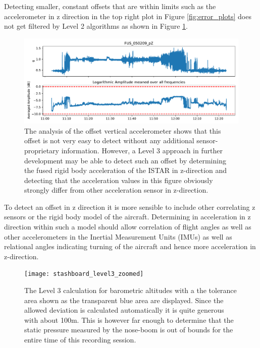 Detecting smaller, constant offsets that are within limits such as the accelerometer in z direction in the top right plot in Figure \ref{fig:error_plots} does not get filtered by Level 2 algorithms as shown in Figure \ref{fig:results_050209}.
\begin{figure}
    \centering
    \includegraphics[width=\textwidth]{03_figures/python_functions/images/FUS_050209}
    \caption[Analysis of the offset vertical accelerometer]{The analysis of the offset vertical accelerometer shows that this offset is not very easy to detect without any additional sensor-proprietary information. However, a Level 3 approach in further development may be able to detect such an offset by determining the fused rigid body acceleration of the ISTAR in z-direction and detecting that the acceleration values in this figure obviously strongly differ from other acceleration sensor in z-direction.}
    \label{fig:results_050209}
\end{figure}

To detect an offset in z direction it is more sensible to include other correlating z sensors or the rigid body model of the aircraft. Determining in acceleration in z direction within such a model should allow correlation of flight angles as well as other accelerometers in the Inertial Measurement Units (IMUs) as well as relational angles indicating turning of the aircraft and hence more acceleration in z-direction.
\begin{figure}
    \centering
    \texttt{[image: stashboard\_level3\_zoomed]}
    \caption[Level 3 SHM for the altitude-dependent parameters.]{The Level 3 calculation for barometric altitudes with a the tolerance area shown as the transparent blue area are displayed. Since the allowed deviation is calculated automatically it is quite generous with about 100m. This is however far enough to determine that the static pressure measured by the nose-boom is out of bounds for the entire time of this recording session.}
    \label{fig:stashboard_level3_zoomed}
\end{figure}

